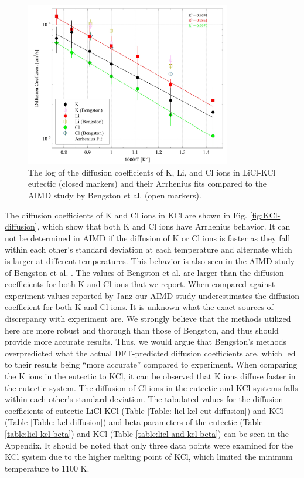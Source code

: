 \documentclass[review]{elsarticle}
\begin{document}
\begin{figure}[h!]
 \centering
 \includegraphics[width=0.8\textwidth]{diff_eutectic_licl_kcl.jpg} 
 \caption{The log of the diffusion coefficients of K, Li, and Cl ions in LiCl-KCl eutectic (closed markers) and their Arrhenius fits compared to the AIMD study by Bengston et al. \cite{Bengston2014} (open markers).}
 \label{fig:LiCl-KCl-diffusion}
\end{figure} 

The diffusion coefficients of K and Cl ions in KCl are shown in Fig. \ref{fig:KCl-diffusion}, which show that both K and Cl ions have Arrhenius behavior. It can not be determined in AIMD if the diffusion of K or Cl ions is faster as they fall within each other's standard deviation at each temperature and alternate which is larger at different temperatures. This behavior is also seen in the AIMD study of Bengston et al. \cite{Bengston2014}. The values of Bengston et al. are larger than the diffusion coefficients for both K and Cl ions that we report. When compared against experiment values reported by Janz \cite{janz_Diffusion} our AIMD study underestimates the diffusion coefficient for both K and Cl ions. It is unknown what the exact sources of discrepancy with experiment are. We strongly believe that the methods utilized here are more robust and thorough than those of Bengston, and thus should provide more accurate results. Thus, we would argue that Bengston’s methods overpredicted what the actual DFT-predicted diffusion coefficients are, which led to their results being “more accurate” compared to experiment. When comparing the K ions in the eutectic to KCl, it can be observed that K ions diffuse faster in the eutectic system. The diffusion of Cl ions in the eutectic and KCl systems falls within each other's standard deviation. The tabulated values for the diffusion coefficients of eutectic LiCl-KCl (Table \ref{Table: licl-kcl-eut diffusion}) and KCl (Table \ref{Table: kcl diffusion}) and beta parameters of the eutectic (Table \ref{table:licl-kcl-beta}) and KCl (Table \ref{table:licl and kcl-beta}) can be seen in the Appendix. It should be noted that only three data points were examined for the KCl system due to the higher melting point of KCl, which limited the minimum temperature to 1100 K. 
\end{document}
